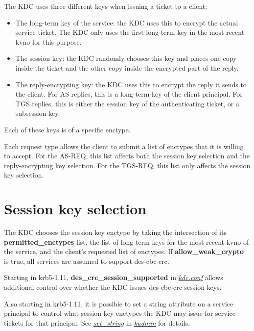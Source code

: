 \documentclass[letterpaper,10pt,english]{sphinxmanual}
\begin{document}
The KDC uses three different keys when issuing a ticket to a client:
\begin{itemize}
\item {} 
The long-term key of the service: the KDC uses this to encrypt the
actual service ticket.  The KDC only uses the first long-term key in
the most recent kvno for this purpose.

\item {} 
The session key: the KDC randomly chooses this key and places one
copy inside the ticket and the other copy inside the encrypted part
of the reply.

\item {} 
The reply-encrypting key: the KDC uses this to encrypt the reply it
sends to the client.  For AS replies, this is a long-term key of the
client principal.  For TGS replies, this is either the session key of the
authenticating ticket, or a subsession key.

\end{itemize}

Each of these keys is of a specific enctype.

Each request type allows the client to submit a list of enctypes that
it is willing to accept.  For the AS-REQ, this list affects both the
session key selection and the reply-encrypting key selection.  For the
TGS-REQ, this list only affects the session key selection.


\section{Session key selection}
\label{admin/enctypes:session-key-selection}\label{admin/enctypes:id1}
The KDC chooses the session key enctype by taking the intersection of
its \textbf{permitted\_enctypes} list, the list of long-term keys for the
most recent kvno of the service, and the client's requested list of
enctypes.  If \textbf{allow\_weak\_crypto} is true, all services are assumed
to support des-cbc-crc.

Starting in krb5-1.11, \textbf{des\_crc\_session\_supported} in
{\hyperref[admin/conf_files/kdc_conf:kdc-conf-5]{\emph{kdc.conf}}} allows additional control over whether the KDC
issues des-cbc-crc session keys.

Also starting in krb5-1.11, it is possible to set a string attribute
on a service principal to control what session key enctypes the KDC
may issue for service tickets for that principal.  See
{\hyperref[admin/admin_commands/kadmin_local:set-string]{\emph{set\_string}}} in {\hyperref[admin/admin_commands/kadmin_local:kadmin-1]{\emph{kadmin}}} for details.
\end{document}
